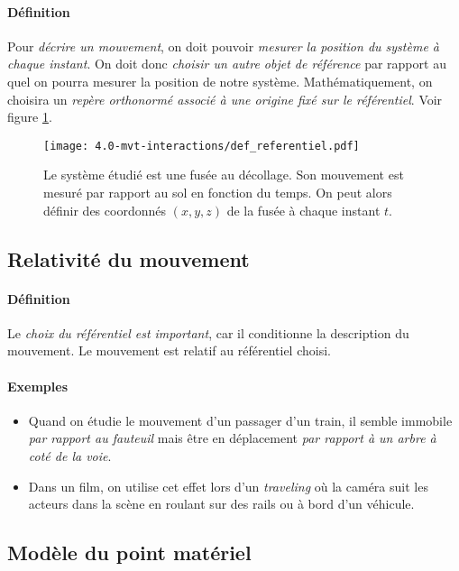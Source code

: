 \paragraph{Définition}Pour \textit{décrire un mouvement}, on doit pouvoir \textit{mesurer la position du système à chaque instant}.
On doit donc \textit{choisir un autre objet de référence} par rapport au quel on pourra mesurer la position de notre système.
Mathématiquement, on choisira un \textit{repère orthonormé associé à une origine fixé sur le référentiel}. Voir figure \ref{fig:def_referentiel}.
\begin{figure}[h!]
  \begin{center}
      \texttt{[image: 4.0-mvt-interactions/def\_referentiel.pdf]}
  \end{center}
  \caption{Le système étudié est une fusée au décollage. Son mouvement est mesuré par rapport au sol en fonction du temps. On peut alors définir des coordonnés $(x,y,z)$ de la fusée à chaque instant $t$.}
  \label{fig:def_referentiel}
\end{figure}


\subsection{Relativité du mouvement} 
\paragraph{Définition} Le \textit{choix du référentiel est important}, car il conditionne la description du mouvement. Le mouvement est relatif au référentiel choisi. 
\paragraph{Exemples} 
\begin{itemize}
 \item Quand on étudie le mouvement d'un passager d'un train, il semble immobile \textit{par rapport au fauteuil} mais être en déplacement \textit{par rapport à un arbre à coté de la voie}. 
 \item Dans un film, on utilise cet effet lors d'un \textit{traveling} où la caméra suit les acteurs dans la scène en roulant sur des rails ou à bord d'un véhicule.
\end{itemize}

\subsection{Modèle du point matériel}
